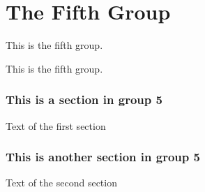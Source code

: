 \hypertarget{group__group5}{\section{The Fifth Group}
\label{group__group5}
}


This is the fifth group.  


This is the fifth group. \hypertarget{mypage1}{}\subsubsection{This is a section in group 5}\label{mypage1}
Text of the first section \hypertarget{mypage2}{}\subsubsection{This is another section in group 5}\label{mypage2}
Text of the second section 
